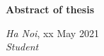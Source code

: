 \begin{center}
	{\fontsize{14}{16}\selectfont \textbf{Abstract of thesis}}
\end{center}


\begin{flushright}
	\begin{minipage}[t]{0.5\textwidth}
		\begin{center}
			\textit{Ha Noi}, xx May 2021\\[2cm]
		
			\textit{Student}
		\end{center}
	\end{minipage}
\end{flushright}
\pagebreak